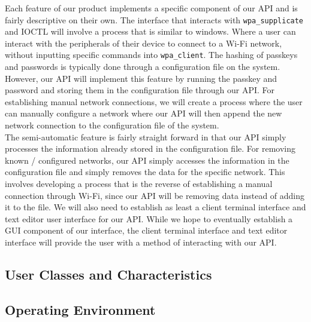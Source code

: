 Each feature of our product implements a specific component of our API and is fairly descriptive on their own. 
The interface that interacts with \texttt{wpa\_supplicate} and IOCTL will involve a process that is similar to 
windows. Where a user can interact with the peripherals of their device to connect to a Wi-Fi network, without 
inputting specific commands into \texttt{wpa\_client}. The hashing of passkeys and passwords is typically done 
through a configuration file on the system. However, our API will implement this feature by running the passkey 
and password and storing them in the configuration file through our API. For establishing manual network connections, 
we will create a process where the user can manually configure a network where our API will then append the new network 
connection to the configuration file of the system. \\
The semi-automatic feature is fairly straight forward in that our API simply processes the information already stored in the 
configuration file. For removing known / configured networks, our API simply accesses the information in the configuration file 
and simply removes the data for the specific network. This involves developing a process that is the reverse of establishing 
a manual connection through Wi-Fi, since our API will be removing data instead of adding it to the file. We will also need 
to establish as least a client terminal interface and text editor user interface for our API. While we hope to eventually 
establish a GUI component of our interface, the client terminal interface and text editor interface will provide the user with a 
method of interacting with our API.

\subsection{User Classes and Characteristics}

\subsection{Operating Environment}


